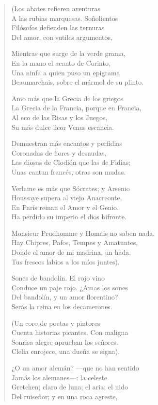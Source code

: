 \documentclass[12pt]{article}
\begin{document}
\begin{verse}
(Los abates refieren aventuras\\
A las rubias marquesas. Soñolientos\\
Filósofos defienden las ternuras\\
Del amor, con sutiles argumentos,  

Mientras que surge de la verde grama,\\
En la mano el acanto de Corinto,\\
Una ninfa a quien puso un epigrama\\
Beaumarchais, sobre el mármol de su plinto.  

Amo más que la Grecia de los griegos\\
La Grecia de la Francia, porque en Francia,\\
Al eco de las Risas y los Juegos,\\
Su más dulce licor Venus escancia.  

Demuestran más encantos y perfidias\\
Coronadas de flores y desnudas,\\
Las diosas de Clodión que las de Fidias;\\
Unas cantan francés, otras son mudas.  

Verlaine es más que Sócrates; y Arsenio\\
Houssaye supera al viejo Anacreonte.\\
En París reinan el Amor y el Genio.\\
Ha perdido su imperio el dios bifronte.  

Monsieur Prudhomme y Homais no saben nada.\\
Hay Chipres, Pafos, Tempes y Amatuntes,\\
Donde el amor de mi madrina, un hada,\\
Tus frescos labios a los míos juntes).  

Sones de bandolín. El rojo vino\\
Conduce un paje rojo. ¿Amas los sones\\
Del bandolín, y un amor florentino?\\
Serás la reina en los decamerones.  

(Un coro de poetas y pintores\\
Cuenta historias picantes. Con maligna\\
Sonrisa alegre aprueban los señores.\\
Clelia enrojece, una dueña se signa).  

¿O un amor alemán? —que no han sentido\\
Jamás los alemanes—: la celeste\\
Gretchen; claro de luna; el aria; el nido\\
Del ruiseñor; y en una roca agreste,  


\end{verse}
\end{document}
